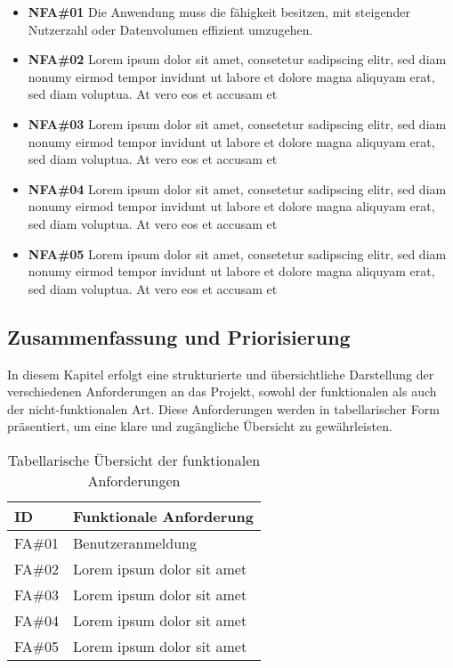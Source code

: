\begin{itemize}
    \item \textbf{NFA\#01} Die Anwendung muss die fähigkeit besitzen, mit steigender Nutzerzahl oder Datenvolumen effizient umzugehen.
    \item \textbf{NFA\#02} Lorem ipsum dolor sit amet, consetetur sadipscing elitr, sed diam nonumy eirmod tempor invidunt ut labore et dolore magna aliquyam erat, sed diam voluptua. At vero eos et accusam et
    \item \textbf{NFA\#03} Lorem ipsum dolor sit amet, consetetur sadipscing elitr, sed diam nonumy eirmod tempor invidunt ut labore et dolore magna aliquyam erat, sed diam voluptua. At vero eos et accusam et
    \item \textbf{NFA\#04} Lorem ipsum dolor sit amet, consetetur sadipscing elitr, sed diam nonumy eirmod tempor invidunt ut labore et dolore magna aliquyam erat, sed diam voluptua. At vero eos et accusam et
    \item \textbf{NFA\#05} Lorem ipsum dolor sit amet, consetetur sadipscing elitr, sed diam nonumy eirmod tempor invidunt ut labore et dolore magna aliquyam erat, sed diam voluptua. At vero eos et accusam et

\end{itemize}

\subsection{Zusammenfassung und Priorisierung}

In diesem Kapitel erfolgt eine strukturierte und übersichtliche Darstellung der verschiedenen Anforderungen an das Projekt, sowohl der funktionalen als auch der nicht-funktionalen Art. Diese Anforderungen werden in tabellarischer Form präsentiert, um eine klare und zugängliche Übersicht zu gewährleisten.



\begin{table}[ht]
    \centering
    \begin{tabularx}{\textwidth}{@{}lX@{}}
    \toprule
    ID & Funktionale Anforderung \\ 
    \midrule
    FA\#01 & Benutzeranmeldung \\
    FA\#02 & Lorem ipsum dolor sit amet \\
    FA\#03 & Lorem ipsum dolor sit amet \\
    FA\#04 & Lorem ipsum dolor sit amet \\
    FA\#05 & Lorem ipsum dolor sit amet \\
    \bottomrule
    \end{tabularx}
    \caption{Tabellarische Übersicht der funktionalen Anforderungen}
    \label{tab:FA-tabelle}
    \end{table}

